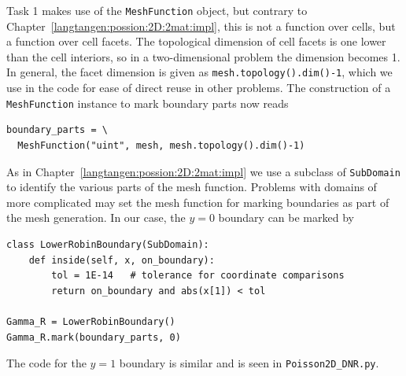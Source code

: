 Task 1 makes use of the {\fontsize{12pt}{12pt}\texttt{MeshFunction}} object, but contrary to
Chapter~\ref{langtangen:possion:2D:2mat:impl}, this is not a function over
cells, but a function over cell facets. The topological dimension of
cell facets is one lower than the cell interiors, so in a two-dimensional
problem the dimension
becomes 1. In general, the facet dimension
is given as {\fontsize{12pt}{12pt}\texttt{mesh.topology().dim()-1}},
which we use in the code for ease of direct reuse in other problems.
The construction of a {\fontsize{12pt}{12pt}\texttt{MeshFunction}} instance to mark boundary parts
now reads
\begin{Verbatim}[fontsize=\fontsize{10pt}{10pt},tabsize=8,baselinestretch=1.05,
fontfamily=tt,xleftmargin=7mm]
boundary_parts = \
  MeshFunction("uint", mesh, mesh.topology().dim()-1)
\end{Verbatim}
\noindent
As in Chapter~\ref{langtangen:possion:2D:2mat:impl} we
use a subclass of {\fontsize{12pt}{12pt}\texttt{SubDomain}} to identify the various parts
of the mesh function. Problems with domains of more complicated may
set the mesh function for marking boundaries as part of the mesh
generation.
In our case, the $y=0$ boundary can be marked by
\begin{Verbatim}[fontsize=\fontsize{10pt}{10pt},tabsize=8,baselinestretch=1.05,
fontfamily=tt,xleftmargin=7mm]
class LowerRobinBoundary(SubDomain):
    def inside(self, x, on_boundary):
        tol = 1E-14   # tolerance for coordinate comparisons
        return on_boundary and abs(x[1]) < tol

Gamma_R = LowerRobinBoundary()
Gamma_R.mark(boundary_parts, 0)
\end{Verbatim}
\noindent
The code for the $y=1$ boundary is similar and is seen in
{\fontsize{12pt}{12pt}\verb!Poisson2D_DNR.py!}.

